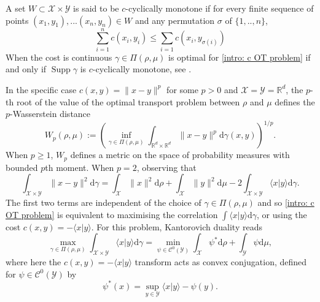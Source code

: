 \documentclass[11pt, oneside, titlepage]{book}
\theoremstyle{plain}
\theoremstyle{definition}
\newcommand{\R}{\mathbb{R}}
\newcommand{\C}{\mathcal{C}}
\newcommand{\X}{\mathcal{X}}
\newcommand{\Y}{\mathcal{Y}}
\newcommand{\di}{\mathrm{d}}
\DeclareMathOperator{\supp}{Supp}
\begin{document}
A set $W \subset \X \times \Y$ is said to be $c$-cyclically monotone if for every finite sequence of points $(x_1, y_1),... (x_n, y_n) \in W$ and any permutation $\sigma$ of $\{1,..,n\}$,
\begin{equation}
\label{intro: c cm definition statment}
    \sum_{i = 1}^n c(x_i, y_i) \leq \sum_{i = 1} c(x_i, y_{\sigma(i)})
\end{equation}
When the cost is continuous $\gamma \in \Pi(\rho, \mu)$ is optimal for \eqref{intro: c OT problem} if and only if $\supp \gamma$ is $c$-cyclically monotone, see \cite[Corollary 1]{schachermayer2009characterization}.







In the specific case $c(x, y) = \| x - y\|^p$ for some $p>0$ and $\X = \Y = \R^d$, the $p$-th root of the value of the optimal transport problem between $\rho$ and $\mu$ defines the $p$-Wasserstein distance
\begin{equation*}
    W_p(\rho, \mu) := \left( \inf_{\gamma \in \Pi(\rho, \mu)} \int_{\R^d \times \R^d} \|x-y\|^p \di \gamma(x, y)\right)^{1/p}.
\end{equation*}
When $p \geq1$, $W_p$ defines a metric on the space of probability measures with bounded $p$th moment. When $p = 2$, observing that
\begin{equation}
   \int_{\X \times \Y} \|x-y\|^2 \di \gamma =  \int_{\X} \|x\|^2 \di \rho + \int_{\X} \|y\|^2 \di \mu - 2 \int_{\X \times \Y} \langle x | y \rangle \di \gamma.  
\end{equation}
The first two terms are independent of the choice of $\gamma \in \Pi(\rho, \mu)$ and so \eqref{intro: c OT problem} is equivalent to maximising the correlation $\int \langle x | y \rangle \di \gamma$, or using the cost $c(x, y) = - \langle x | y \rangle$. For this problem, Kantorovich duality reads
\begin{equation}
\label{intro: max correlation and its dual}
    \max_{\gamma \in \Pi(\rho, \mu)} \int_{\X \times \Y} \langle x | y \rangle \di \gamma = \min_{\psi \in \C^0(\Y)} \int_\X \psi^* \di \rho + \int_\Y \psi\di \mu,
\end{equation}
where here the $c(x, y)= - \langle x | y \rangle $ transform acts as convex conjugation, defined for $\psi \in \C^0(\Y)$ by
\begin{equation}
\label{eq: legendre transform defn}
    \psi^*(x) = \sup_{y \in \Y} \langle x | y \rangle - \psi(y).
\end{equation}
\end{document}
